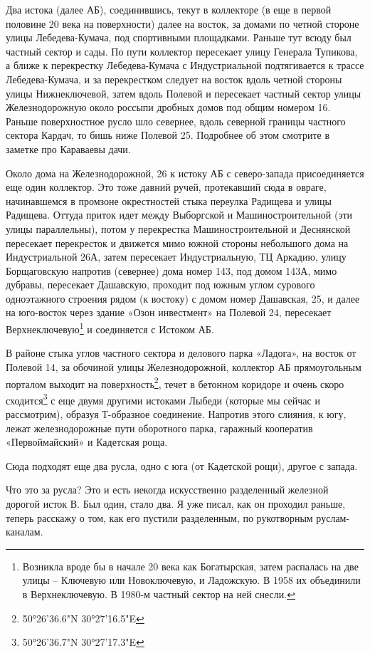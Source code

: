 Два истока (далее АБ), соединившись, текут в коллекторе (в еще в первой половине 20 века на поверхности) далее на восток, за домами по четной стороне улицы Лебедева-Кумача, под спортивными площадками. Раньше тут всюду был частный сектор и сады. По пути коллектор пересекает улицу Генерала Тупикова, а ближе к перекрестку Лебедева-Кумача с Индустриальной подтягивается к трассе Лебедева-Кумача, и за перекрестком следует на восток вдоль четной стороны улицы Нижнеключевой, затем вдоль Полевой и пересекает частный сектор улицы Железнодорожную около россыпи дробных домов под общим номером 16. Раньше поверхностное русло шло севернее, вдоль северной границы частного сектора Кардач, то бишь ниже Полевой 25. Подробнее об этом смотрите в заметке про Караваевы дачи.

Около дома на Железнодорожной, 26 к истоку АБ с северо-запада присоединяется еще один коллектор. Это тоже давний ручей, протекавший сюда в овраге, начинавшемся в промзоне окрестностей стыка переулка Радищева и улицы Радищева. Оттуда приток идет между Выборгской и Машиностроительной (эти улицы параллельны), потом у перекрестка Машиностроительной и Деснянской пересекает перекресток и движется мимо южной стороны небольшого дома на Индустриальной 26А, затем пересекает Индустриальную, ТЦ Аркадию, улицу Борщаговскую напротив (севернее) дома номер 143, под домом 143А, мимо дубравы, пересекает Дашавскую, проходит под южным углом сурового одноэтажного строения рядом (к востоку) с домом номер Дашавская, 25, и далее на юго-восток через здание «Озон инвестмент» на Полевой 24, пересекает Верхнеключевую\footnote{Возникла вроде бы в начале 20 века как Богатырская, затем распалась на две улицы – Ключевую или Новоключевую, и Ладожскую. В 1958 их объединили в Верхнеключевую. В 1980-м частный сектор на ней снесли.} и соединяется с Истоком АБ.

В районе стыка углов частного сектора и делового парка «Ладога», на восток от Полевой 14, за обочиной улицы Железнодорожной, коллектор АБ прямоугольным порталом выходит на поверхность\footnote{50°26'36.6"N 30°27'16.5"E},  течет в бетонном коридоре и очень скоро сходится\footnote{50°26'36.7"N 30°27'17.3"E} с еще двумя другими истоками Лыбеди (которые мы сейчас и рассмотрим), образуя Т-образное соединение. Напротив этого слияния, к югу, лежат железнодорожные пути оборотного парка, гаражный кооператив «Первоймайский» и Кадетская роща.

Сюда подходят еще два русла, одно с юга (от Кадетской рощи), другое с запада.

Что это за русла? Это и есть некогда искусственно разделенный железной дорогой исток В. Был один, стало два. Я уже писал, как он проходил раньше, теперь расскажу о том, как его пустили разделенным, по рукотворным руслам-каналам. 

